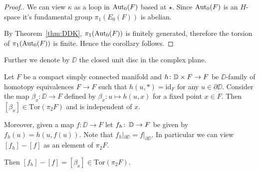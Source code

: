 \documentclass{amsart}
\begin{document}
\begin{proof}[Proof.]
We can view $\kappa$ as a loop in $\operatorname{\rm Aut}_0(F)$ based at $\star$.
Since $\operatorname{\rm Aut}_0(F)$ is an $H$-space it's fundamental group  
$\pi_1(E_0(F))$ is abelian. 

By Theorem~\ref{thm:DDK}, $\pi_1(\operatorname{\rm Aut}_0(F))$ is finitely generated,
therefore the torsion of $\pi_1(\operatorname{\rm Aut}_0(F))$ is finite.
Hence the corollary follows.
\end{proof}

Further we denote by $\DD$ the closed unit disc in the complex plane.

\begin{techlem}\label{techlem}
Let $F$ be a compact simply connected manifold and $h\colon \DD\times F\z\to F$ be 
$\DD$-family of homotopy equivalences $F\to F$ such that $h(u,*)=\mathrm{id}_F$ for any
$u\in\partial \DD$. 
Consider the map $\beta_x\colon \DD\to F$ defined by $\beta_x\colon u\mapsto h(u,x)$ for a fixed point $x\in F$. 
Then $[\beta_x]\in \mathrm{Tor}(\pi_2F)$ and is independent of $x$.

Moreover, given a map $f\colon \DD\to F$ let $f_h\colon\thinspace \mathbb{D}\to F$ be given by $f_h(u)=h(u,f(u))$.
Note that  $f_h|_{\partial \DD}=f|_{\partial \DD}$. In particular we can view $[f_h]-[f]$ as an element of $\pi_2F$.

Then 
$[f_h]-[f]=[\beta_x]\in \mathrm{Tor}(\pi_2F)$. 
\end{techlem}
\end{document}
